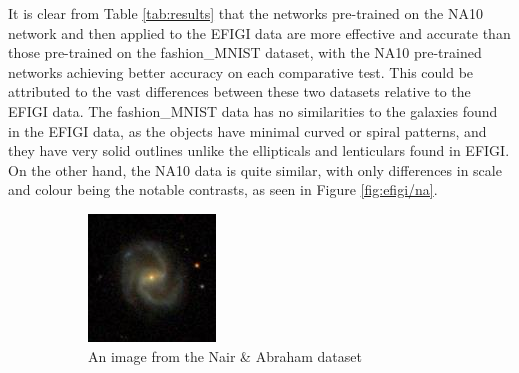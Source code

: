 \documentclass[12pt, onecolumn]{aa}
\begin{document}
It is clear from Table \ref{tab:results} that the networks pre-trained on the NA10 network and then applied to the EFIGI data are more effective and accurate than those pre-trained on the fashion\_MNIST dataset, with the NA10 pre-trained networks achieving better accuracy on each comparative test. This could be attributed to the vast differences between these two datasets relative to the EFIGI data. The fashion\_MNIST data has no similarities to the galaxies found in the EFIGI data, as the objects have minimal curved or spiral patterns, and they have very solid outlines unlike the ellipticals and lenticulars found in EFIGI. On the other hand, the NA10 data is quite similar, with only differences in scale and colour being the notable contrasts, as seen in Figure \ref{fig:efigi/na}.

\begin{figure}[t!]
    \centering
    \begin{subfigure}[t]{0.4\linewidth}
        \includegraphics[width=\linewidth]{Figures/10249.jpg}
        \caption{An image from the Nair \& Abraham dataset}
    \end{subfigure}
    ~
    \begin{subfigure}[t]{0.4\linewidth}

\end{subfigure}
\end{figure}
\end{document}
